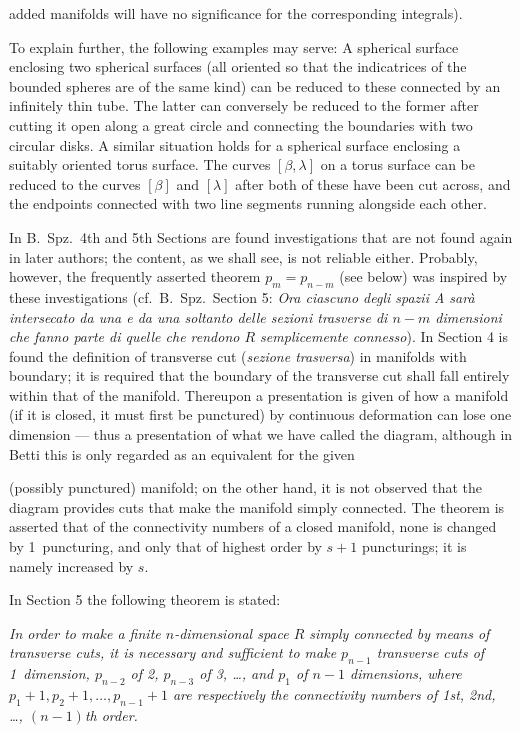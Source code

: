 \documentclass{article}
\begin{document}
added manifolds will have no significance for the corresponding integrals).

To explain further, the following examples may serve: A spherical surface enclosing two spherical surfaces (all oriented so that the indicatrices of the bounded spheres are of the same kind) can be reduced to these connected by an infinitely thin tube. The latter can conversely be reduced to the former after cutting it open along a great circle and connecting the boundaries with two circular disks. A similar situation holds for a spherical surface enclosing a suitably oriented torus surface. The curves $[\beta, \lambda]$ on a torus surface can be reduced to the curves $[\beta]$ and $[\lambda]$ after both of these have been cut across, and the endpoints connected with two line segments running alongside each other.

In B.~Spz.\ 4th and 5th Sections are found investigations that are not found again in later authors; the content, as we shall see, is not reliable either. Probably, however, the frequently asserted theorem $p_m = p_{n-m}$ (see below) was inspired by these investigations (cf.\ B.~Spz.\ Section 5: \emph{Ora ciascuno degli spazii A sarà intersecato da una e da una soltanto delle sezioni trasverse di $n - m$ dimensioni che fanno parte di quelle che rendono $R$ semplicemente connesso}). In Section 4 is found the definition of transverse cut (\emph{sezione trasversa}) in manifolds with boundary; it is required that the boundary of the transverse cut shall fall entirely within that of the manifold. Thereupon a presentation is given of how a manifold (if it is closed, it must first be punctured) by continuous deformation can lose one dimension --- thus a presentation of what we have called the diagram, although in Betti this is only regarded as an equivalent for the given

(possibly punctured) manifold; on the other hand, it is not observed that the diagram provides cuts that make the manifold simply connected. The theorem is asserted that of the connectivity numbers of a closed manifold, none is changed by 1~puncturing, and only that of highest order by $s + 1$ puncturings; it is namely increased by $s$.

In Section 5 the following theorem is stated:

\emph{In order to make a finite $n$-dimensional space $R$ simply connected by means of transverse cuts, it is necessary and sufficient to make $p_{n-1}$ transverse cuts of 1~dimension, $p_{n-2}$ of 2, $p_{n-3}$ of 3, \dots, and $p_1$ of $n - 1$ dimensions, where $p_1 + 1, p_2 + 1, \dots, p_{n-1} + 1$ are respectively the connectivity numbers of 1st, 2nd, \dots, $(n - 1)$th order.}
\end{document}
